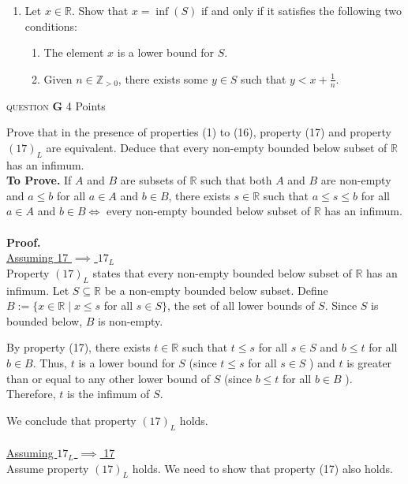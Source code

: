 \documentclass[11pt]{article}
\newcommand{\problem
}[2]{
\begin{mdframed}
    \textsc{question} \textbf{#1} \hfill #2
\end{mdframed}
}
\begin{document}
\begin{enumerate}
\begin{enumerate}
	      \end{enumerate}
	\item Let $x \in \mathbb{R}$. Show that $x=\inf (S)$ if and only if it satisfies the following two conditions:
	      \begin{enumerate}
		      \item The element $x$ is a lower bound for $S$.
		      \item Given $n \in \mathbb{Z}_{>0}$, there exists some $y \in S$ such that $y<x+\frac{1}{n}$.
	      \end{enumerate}
\end{enumerate}


\newpage
\problem{G}{4 Points}
Prove that in the presence of properties (1) to (16), property (17) and property $(17)_L$ are equivalent. Deduce that every non-empty bounded below subset of $\mathbb{R}$ has an infimum.
\\

\noindent \textbf{To Prove.} If $A$ and $B$ are subsets of $\mathbb{R}$ such that both $A$ and $B$ are non-empty and $a \leq b$ for all $a \in A$ and $b \in B$, there exists $s \in \mathbb{R}$ such that $a \leq s \leq b$ for all $a \in A$ and $b \in B \iff$ every non-empty bounded below subset of $\mathbb{R}$ has an infimum.
\\
\\
\textbf{Proof.}\\
\underline{Assuming 17 $\implies$ $17_L$}\\
Property $(17)_L$ states that every non-empty bounded below subset of $\mathbb{R}$ has an infimum. Let $S \subseteq \mathbb{R}$ be a non-empty bounded below subset. Define $B:=\{x \in \mathbb{R} \mid x \leq s$ for all $s \in S\}$, the set of all lower bounds of $S$. Since $S$ is bounded below, $B$ is non-empty.

\noindent By property (17), there exists $t \in \mathbb{R}$ such that $t \leq s$ for all $s \in S$ and $b \leq t$ for all $b \in B$. Thus, $t$ is a lower bound for $S$ (since $t \leq s$ for all $s \in S$ ) and $t$ is greater than or equal to any other lower bound of $S$ (since $b \leq t$ for all $b \in B$ ). Therefore, $t$ is the infimum of $S$.

\noindent We conclude that property $(17)_L$ holds.
\\
\\
\noindent \underline{Assuming $17_L$ $\implies$ 17}\\
Assume property $(17)_L$ holds. We need to show that property (17) also holds.
\end{document}
